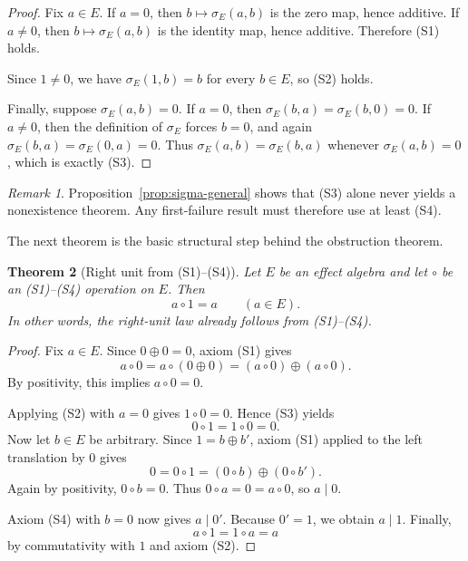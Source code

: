 \documentclass[11pt]{article}
\newtheorem{theorem}{Theorem}[section]
\theoremstyle{definition}
\theoremstyle{remark}
\newtheorem{remark}[theorem]{Remark}
\numberwithin{equation}{section}
\newcommand{\op}{\oplus}
\begin{document}
\begin{proof}
Fix $a\in E$. If $a=0$, then $b\mapsto \sigma_E(a,b)$ is the zero map, hence additive. If $a\neq 0$, then $b\mapsto \sigma_E(a,b)$ is the identity map, hence additive. Therefore \textup{(S1)} holds.

Since $1\neq 0$, we have $\sigma_E(1,b)=b$ for every $b\in E$, so \textup{(S2)} holds.

Finally, suppose $\sigma_E(a,b)=0$. If $a=0$, then $\sigma_E(b,a)=\sigma_E(b,0)=0$. If $a\neq 0$, then the definition of $\sigma_E$ forces $b=0$, and again $\sigma_E(b,a)=\sigma_E(0,a)=0$. Thus $\sigma_E(a,b)=\sigma_E(b,a)$ whenever $\sigma_E(a,b)=0$, which is exactly \textup{(S3)}.
\end{proof}

\begin{remark}\label{rem:s3-never-fatal}
Proposition~\ref{prop:sigma-general} shows that \textup{(S3)} alone never yields a nonexistence theorem. Any first-failure result must therefore use at least \textup{(S4)}.
\end{remark}

The next theorem is the basic structural step behind the obstruction theorem.

\begin{theorem}[Right unit from \textup{(S1)}--\textup{(S4)}]\label{thm:right-unit}
Let $E$ be an effect algebra and let $\circ$ be an \textup{(S1)}--\textup{(S4)} operation on $E$. Then
\[
a\circ 1=a
\qquad (a\in E).
\]
In other words, the right-unit law already follows from \textup{(S1)}--\textup{(S4)}.
\end{theorem}

\begin{proof}
Fix $a\in E$. Since $0\op 0=0$, axiom \textup{(S1)} gives
\[
a\circ 0=a\circ(0\op 0)=(a\circ 0)\op(a\circ 0).
\]
By positivity, this implies $a\circ 0=0$.

Applying \textup{(S2)} with $a=0$ gives $1\circ 0=0$. Hence \textup{(S3)} yields
\[
0\circ 1=1\circ 0=0.
\]
Now let $b\in E$ be arbitrary. Since $1=b\op b'$, axiom \textup{(S1)} applied to the left translation by $0$ gives
\[
0=0\circ 1=(0\circ b)\op(0\circ b').
\]
Again by positivity, $0\circ b=0$. Thus $0\circ a=0=a\circ 0$, so $a\mid 0$.

Axiom \textup{(S4)} with $b=0$ now gives $a\mid 0'$. Because $0'=1$, we obtain $a\mid 1$. Finally,
\[
a\circ 1=1\circ a=a
\]
by commutativity with $1$ and axiom \textup{(S2)}.
\end{proof}
\end{document}
